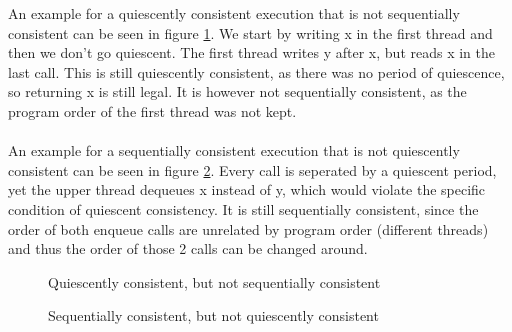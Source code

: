 \documentclass[a4paper,%
11pt,%
DIV=14,
headsepline,%
headings=normal,
]{scrartcl}
\begin{document}
An example for a quiescently consistent execution that is not sequentially consistent can be seen in figure \ref{fig:qc_not_seq}. We start by writing x in the first thread and then we don't go quiescent. The first thread writes y after x, but reads x in the last call. This is still quiescently consistent, as there was no period of quiescence, so returning x is still legal. It is however not sequentially consistent, as the program order of the first thread was not kept.\\
\\
An example for a sequentially consistent execution that is not quiescently consistent can be seen in figure \ref{fig:seq_not_qc}. Every call is seperated by a quiescent period, yet the upper thread dequeues x instead of y, which would violate the specific condition of quiescent consistency. It is still sequentially consistent, since the order of both enqueue calls are unrelated by program order (different threads) and thus the order of those 2 calls can be changed around.

\begin{figure}[h]
\hspace*{8em}
\caption{Quiescently consistent, but not sequentially consistent}
\label{fig:qc_not_seq}
\end{figure}

\begin{figure}[h]
\hspace*{8em}
\caption{Sequentially consistent, but not quiescently consistent}
\label{fig:seq_not_qc}
\end{figure}
\end{document}
